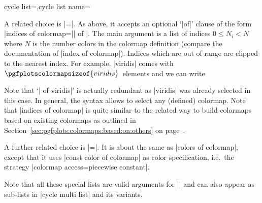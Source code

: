 \begin{pgfplotskeylist}{cycle list=,cycle list name=}
{A related choice is |=|. As above, it accepts an optional `|of|' clause of the form |indices of colormap=|| of |. The main argument is a list of indices $0\le N_i < N$ where $N$ is the number colors in the colormap definition (compare the documentation of |index of colormap|). Indices which are out of range are clipped to the nearest index. For example, |viridis| comes with $\pgfplotscolormapsizeof{viridis}$~elements and we can write
\begin{codeexample}[]
\end{codeexample}
Note that `| of viridis|' is actually redundant as |viridis| was already selected in this case. In general, the syntax allows to select any (defined) colormap.  Note that |indices of colormap| is quite similar to the related way to build colormaps based on existing colormaps as outlined in Section~\ref{sec:pgfplots:colormaps:based:on:others} on page~\pageref{sec:pgfplots:colormaps:based:on:others}.

A further related choice is |=|. It is about the same as |colors of colormap|, except that it uses |const color of colormap| as color specification, i.e.\ the strategy |colormap access=piecewise constant|.

Note that all these special lists are valid arguments for |\pgfplotscreateplotcyclelist| and can also appear as sub-lists in |cycle multi list| and its variants.

}
\end{pgfplotskeylist}
